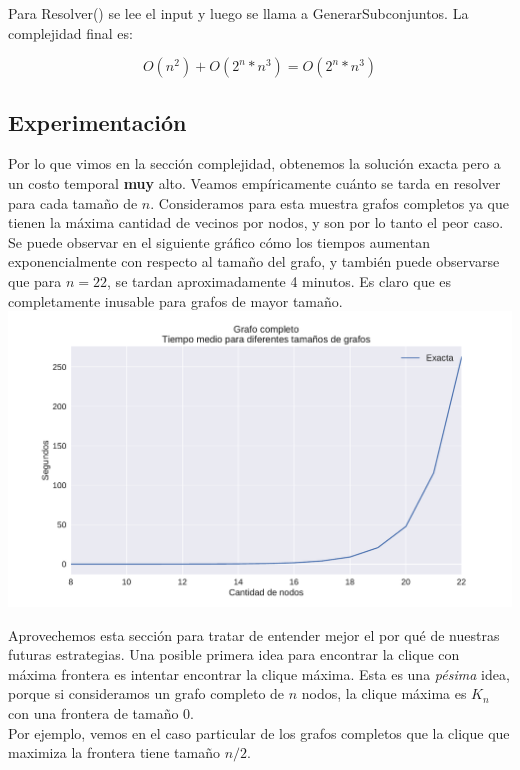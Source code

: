 Para Resolver() se lee el input y luego se llama a GenerarSubconjuntos. La complejidad final es:

$$ O(n^2) + O(2^{n} * n^{3}) = O(2^{n} * n^{3})$$

\subsection{Experimentación}

Por lo que vimos en la sección complejidad, obtenemos la solución exacta pero a un costo temporal \textbf{muy} alto. Veamos empíricamente cuánto se tarda en resolver para cada tamaño de $n$. Consideramos para esta muestra grafos completos ya que tienen la máxima cantidad de vecinos por nodos, y son por lo tanto el peor caso. \\

Se puede observar en el siguiente gráfico cómo los tiempos aumentan exponencialmente con respecto al tamaño del grafo, y también puede observarse que para $n = 22$, se tardan aproximadamente 4 minutos. Es claro que es completamente inusable para grafos de mayor tamaño. \\

{\centering
    \includegraphics[width=1\textwidth]{informe/imgs/exp_completo_tiempo_exacta.pdf} \\
}

Aprovechemos esta sección para tratar de entender mejor el por qué de nuestras futuras estrategias. Una posible primera idea para encontrar la clique con máxima frontera es intentar encontrar la clique máxima. Esta es una \textit{pésima} idea, porque si consideramos un grafo completo de $n$ nodos, la clique máxima es $K_n$ con una frontera de tamaño 0. \\

Por ejemplo, vemos en el caso particular de los grafos completos que la clique que maximiza la frontera tiene tamaño $n/2$.

